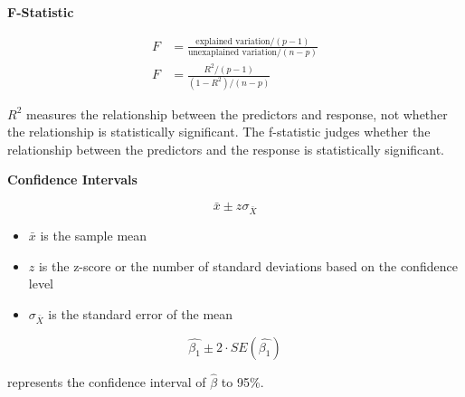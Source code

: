 \documentclass[
]{article}
\begin{document}
\textbf{F-Statistic}

\begin{align}
F &= \frac{\text{explained variation}/(p-1)}{\text{unexaplained variation}/(n-p)}\\
F &= \frac{R^2/(p-1)}{(1-R^2)/(n-p)}
\end{align}

\(R^2\) measures the relationship between the predictors and response,
not whether the relationship is statistically significant. The
f-statistic judges whether the relationship between the predictors and
the response is statistically significant.

\textbf{Confidence Intervals}

\[\bar{x} \pm z\sigma_{\bar{X}}\]

\begin{itemize}
\item
  \(\bar{x}\) is the sample mean
\item
  \(z\) is the z-score or the number of standard deviations based on the
  confidence level
\item
  \(\sigma_{\bar{X}}\) is the standard error of the mean
\end{itemize}

\[\hat{\beta_1} \pm 2 \cdot SE(\hat{\beta_1})\]

represents the confidence interval of \(\hat{\beta}\) to 95\%.
\end{document}
